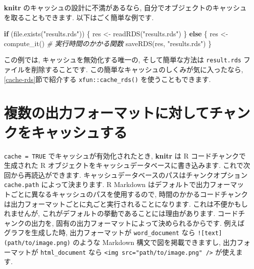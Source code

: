 \documentclass[
  11pt,
  lualatex,
  ja=standard]{bxjsreport}
\newenvironment{Shaded}{\begin{snugshade}}{\end{snugshade}}
\newcommand{\CommentTok}[1]{\textcolor[rgb]{0.56,0.35,0.01}{\textit{#1}}}
\newcommand{\ControlFlowTok}[1]{\textcolor[rgb]{0.13,0.29,0.53}{\textbf{#1}}}
\newcommand{\FunctionTok}[1]{\textcolor[rgb]{0.00,0.00,0.00}{#1}}
\newcommand{\NormalTok}[1]{#1}
\newcommand{\OtherTok}[1]{\textcolor[rgb]{0.56,0.35,0.01}{#1}}
\newcommand{\StringTok}[1]{\textcolor[rgb]{0.31,0.60,0.02}{#1}}
\begin{document}
\textbf{knitr} のキャッシュの設計に不満があるなら, 自分でオブジェクトのキャッシュを取ることもできます. 以下はごく簡単な例です.

\begin{Shaded}
\begin{Highlighting}[numbers=left,,]
\ControlFlowTok{if}\NormalTok{ (}\FunctionTok{file.exists}\NormalTok{(}\StringTok{"results.rds"}\NormalTok{)) \{}
\NormalTok{  res }\OtherTok{\textless{}{-}} \FunctionTok{readRDS}\NormalTok{(}\StringTok{"results.rds"}\NormalTok{)}
\NormalTok{\} }\ControlFlowTok{else}\NormalTok{ \{}
\NormalTok{  res }\OtherTok{\textless{}{-}} \FunctionTok{compute\_it}\NormalTok{()  }\CommentTok{\# 実行時間のかかる関数}
  \FunctionTok{saveRDS}\NormalTok{(res, }\StringTok{"results.rds"}\NormalTok{)}
\NormalTok{\}}
\end{Highlighting}
\end{Shaded}

この例では, キャッシュを無効化する唯一の, そして簡単な方法は \texttt{result.rds} ファイルを削除することです. この簡単なキャッシュのしくみが気に入ったなら, \ref{cache-rds}節で紹介する \texttt{xfun::cache\_rds()} を使うこともできます.

\hypertarget{cache-path}{%
\section{複数の出力フォーマットに対してチャンクをキャッシュする}\label{cache-path}}

\texttt{cache = TRUE} でキャッシュが有効化されたとき, \textbf{knitr} は R コードチャンクで生成された R オブジェクトをキャッシュデータベースに書き込みます. これで次回から再読込ができます. キャッシュデータベースのパスはチャンクオプション \texttt{cache.path} によって決まります. R Markdown はデフォルトで出力フォーマットごとに異なるキャッシュのパスを使用するので, 時間のかかるコードチャンクは出力フォーマットごとに丸ごと実行されることになります. これは不便かもしれませんが, これがデフォルトの挙動であることには理由があります. コードチャンクの出力を, 固有の出力フォーマットによって決められるからです. 例えばグラフを生成した時, 出力フォーマットが \texttt{word\_document} なら \texttt{!{[}text{]}(path/to/image.png)} のような Markdown 構文で図を掲載できますし, 出力フォーマットが \texttt{html\_document} なら \texttt{\textless{}img\ src="path/to/image.png"\ /\textgreater{}} が使えます.
\end{document}
